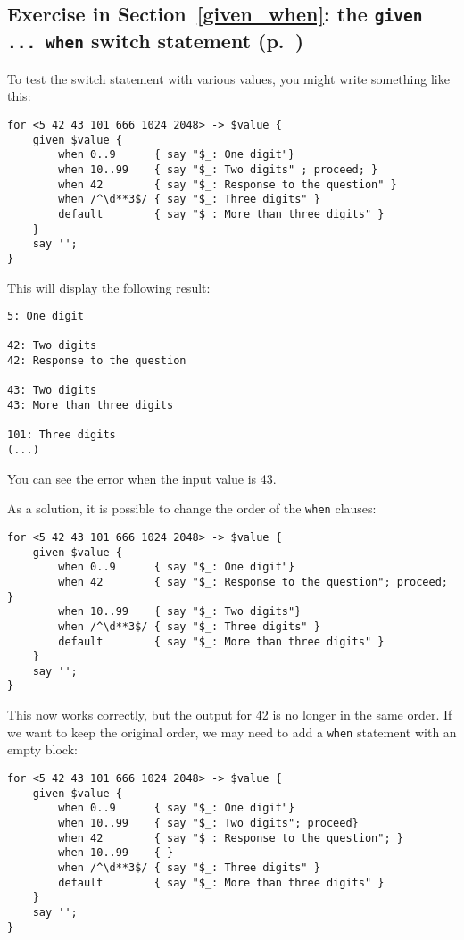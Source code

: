 \subsection{Exercise in Section~\ref{given_when}: the {\tt given ... when} switch statement (p.~\pageref{proceed_ex})}
\label{sol_proceed_ex}

To test the switch statement with various values, you might 
write something like this:

\begin{verbatim}
for <5 42 43 101 666 1024 2048> -> $value {
    given $value {
        when 0..9      { say "$_: One digit"}
        when 10..99    { say "$_: Two digits" ; proceed; }
        when 42        { say "$_: Response to the question" }
        when /^\d**3$/ { say "$_: Three digits" }
        default        { say "$_: More than three digits" }
    }
    say '';
}
\end{verbatim}

This will display the following result:

\begin{verbatim}
5: One digit

42: Two digits
42: Response to the question

43: Two digits
43: More than three digits

101: Three digits
(...)
\end{verbatim}

You can see the error when the input value is 43.

As a solution, it is possible to change the order of the 
{\tt when} clauses:

\begin{verbatim}
for <5 42 43 101 666 1024 2048> -> $value {
    given $value {
        when 0..9      { say "$_: One digit"}
        when 42        { say "$_: Response to the question"; proceed; }
        when 10..99    { say "$_: Two digits"}
        when /^\d**3$/ { say "$_: Three digits" }
        default        { say "$_: More than three digits" }
    }
    say '';
}
\end{verbatim}

This now works correctly, but the output for 42 is no longer 
in the same order. If we want to keep the original order,  
we may need to add a {\tt when} statement with an empty block:

\begin{verbatim}
for <5 42 43 101 666 1024 2048> -> $value {
    given $value {
        when 0..9      { say "$_: One digit"}
        when 10..99    { say "$_: Two digits"; proceed}
        when 42        { say "$_: Response to the question"; }
        when 10..99    { }
        when /^\d**3$/ { say "$_: Three digits" }
        default        { say "$_: More than three digits" }
    }
    say '';
}
\end{verbatim}

